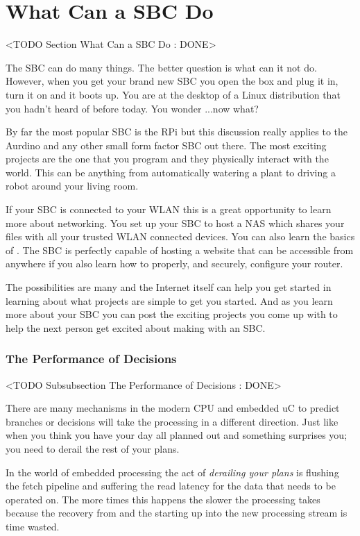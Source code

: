 \section{What Can a SBC Do}
	<TODO Section What Can a SBC Do : DONE>

The \ac{SBC} can do many things. The better question is what can it not do. However, when you get your brand new \ac{SBC} you open the box and plug it in, turn it on and it boots up. You are at the desktop of a Linux distribution that you hadn't heard of before today. You wonder ...now what?

By far the most popular \ac{SBC} is the \ac{RPi} \cite{rpiorg} but this discussion really applies to the Aurdino \cite{arduinoref} and any other small form factor \ac{SBC} out there. The most exciting projects are the one that you program and they physically interact with the world. This can be anything from automatically watering a plant to driving a robot around your living room.

If your \ac{SBC} is connected to your \ac{WLAN} this is a great opportunity to learn more about networking. You set up your \ac{SBC} to host a \ac{NAS} which shares your files with all your trusted \ac{WLAN} connected devices. You can also learn the basics of . The \ac{SBC} is perfectly capable of hosting a website that can be accessible from anywhere if you also learn how to properly, and securely, configure your router.

The possibilities are many and the Internet itself can help you get started in learning about what projects are simple to get you started. And as you learn more about your \ac{SBC} you can post the exciting projects you come up with to help the next person get excited about making with an \ac{SBC}.
	
\subsubsection{The Performance of Decisions}
	<TODO Subsubsection  The Performance of Decisions : DONE>

There are many mechanisms in the modern \ac{CPU} and embedded \ac{uC} to predict branches or decisions will take the processing in a different direction. Just like when you think you have your day all planned out and something surprises you; you need to derail the rest of your plans.

In the world of embedded processing the act of \emph{derailing your plans} is flushing the fetch pipeline and suffering the read latency for the data that needs to be operated on. The more times this happens the slower the processing takes because the recovery from and the starting up into the new processing stream is time wasted.

